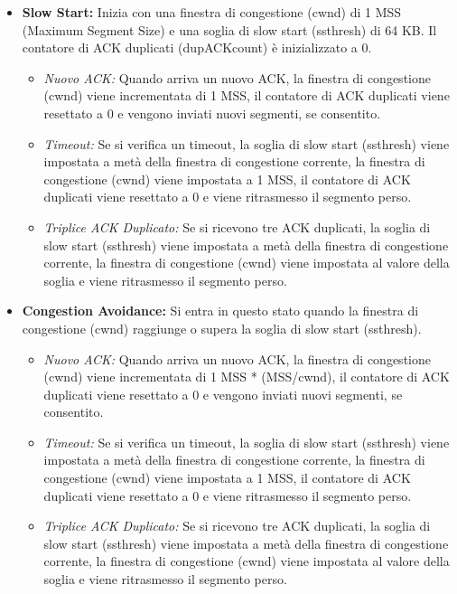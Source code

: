 \begin{itemize}
    \item \textbf{Slow Start:} Inizia con una finestra di congestione (cwnd) di 1 MSS (Maximum Segment Size) e una soglia di slow start (ssthresh) di 64 KB. Il contatore di ACK duplicati (dupACKcount) è inizializzato a 0.
        \begin{itemize}
            \item \textit{Nuovo ACK:} Quando arriva un nuovo ACK, la finestra di congestione (cwnd) viene incrementata di 1 MSS, il contatore di ACK duplicati viene resettato a 0 e vengono inviati nuovi segmenti, se consentito.
            \item \textit{Timeout:} Se si verifica un timeout, la soglia di slow start (ssthresh) viene impostata a metà della finestra di congestione corrente, la finestra di congestione (cwnd) viene impostata a 1 MSS, il contatore di ACK duplicati viene resettato a 0 e viene ritrasmesso il segmento perso.
            \item \textit{Triplice ACK Duplicato:} Se si ricevono tre ACK duplicati, la soglia di slow start (ssthresh) viene impostata a metà della finestra di congestione corrente, la finestra di congestione (cwnd) viene impostata al valore della soglia e viene ritrasmesso il segmento perso.
        \end{itemize}
    \item \textbf{Congestion Avoidance:} Si entra in questo stato quando la finestra di congestione (cwnd) raggiunge o supera la soglia di slow start (ssthresh).
        \begin{itemize}
            \item \textit{Nuovo ACK:} Quando arriva un nuovo ACK, la finestra di congestione (cwnd) viene incrementata di 1 MSS * (MSS/cwnd), il contatore di ACK duplicati viene resettato a 0 e vengono inviati nuovi segmenti, se consentito.
            \item \textit{Timeout:} Se si verifica un timeout, la soglia di slow start (ssthresh) viene impostata a metà della finestra di congestione corrente, la finestra di congestione (cwnd) viene impostata a 1 MSS, il contatore di ACK duplicati viene resettato a 0 e viene ritrasmesso il segmento perso.
            \item \textit{Triplice ACK Duplicato:} Se si ricevono tre ACK duplicati, la soglia di slow start (ssthresh) viene impostata a metà della finestra di congestione corrente, la finestra di congestione (cwnd) viene impostata al valore della soglia e viene ritrasmesso il segmento perso.
        \end{itemize}
\end{itemize}

